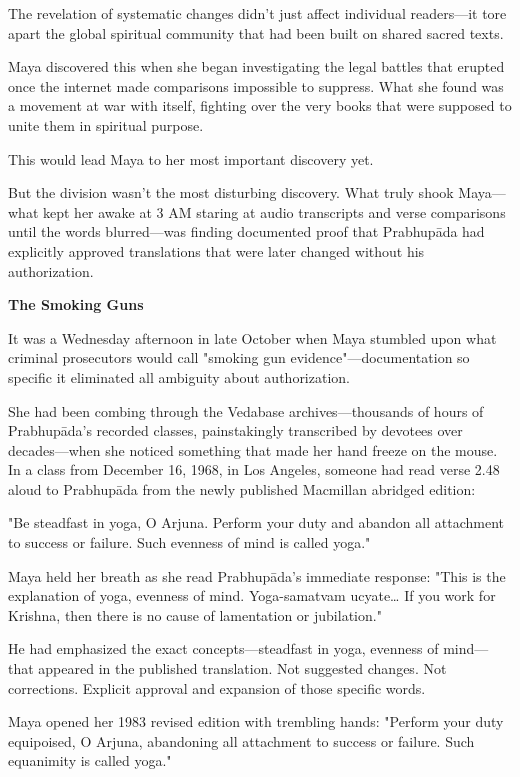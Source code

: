 \documentclass[12pt,twoside]{book}
\begin{document}
\normalfont\justifying
The revelation of systematic changes didn't just affect individual readers—it tore apart the global spiritual community that had been built on shared sacred texts.

Maya discovered this when she began investigating the legal battles that erupted once the internet made comparisons impossible to suppress. What she found was a movement at war with itself, fighting over the very books that were supposed to unite them in spiritual purpose.

This would lead Maya to her most important discovery yet.

But the division wasn't the most disturbing discovery. What truly shook Maya—what kept her awake at 3 AM staring at audio transcripts and verse comparisons until the words blurred—was finding documented proof that Prabhupāda had explicitly approved translations that were later changed without his authorization.


\vspace{0.5cm}
\textbf{The Smoking Guns}
\vspace{0.2cm}


It was a Wednesday afternoon in late October when Maya stumbled upon what criminal prosecutors would call "smoking gun evidence"—documentation so specific it eliminated all ambiguity about authorization.

She had been combing through the Vedabase archives—thousands of hours of Prabhupāda's recorded classes, painstakingly transcribed by devotees over decades—when she noticed something that made her hand freeze on the mouse. In a class from December 16, 1968, in Los Angeles, someone had read verse 2.48 aloud to Prabhupāda from the newly published Macmillan abridged edition:

"Be steadfast in yoga, O Arjuna. Perform your duty and abandon all attachment to success or failure. Such evenness of mind is called yoga."

Maya held her breath as she read Prabhupāda's immediate response: "This is the explanation of yoga, evenness of mind. Yoga-samatvam ucyate\ldots{} If you work for Krishna, then there is no cause of lamentation or jubilation."

He had emphasized the exact concepts—steadfast in yoga, evenness of mind—that appeared in the published translation. Not suggested changes. Not corrections. Explicit approval and expansion of those specific words.

Maya opened her 1983 revised edition with trembling hands: "Perform your duty equipoised, O Arjuna, abandoning all attachment to success or failure. Such equanimity is called yoga."
\end{document}
